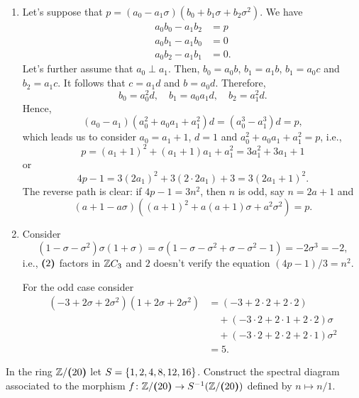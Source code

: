 \begin{solution}
\begin{enumerate}[\rm a)]
        \item Let's suppose that $p=(a_0-a_1\sigma)(b_0+b_1\sigma+b_2\sigma^2)$. We have
        \begin{align*}
            a_0b_0 - a_1b_2 &= p\\
            a_0b_1 - a_1b_0 &= 0\\
            a_0b_2 - a_1b_1 &= 0.
        \end{align*}
        Let's further assume that $a_0\perp a_1$. Then, $b_0=a_0b$, $b_1=a_1b$, $b_1=a_0c$ and $b_2=a_1c$. It follows that $c=a_1d$ and $b=a_0d$. Therefore,
        $$
            b_0=a_0^2d,\quad b_1=a_0a_1d,\quad b_2=a_1^2d.
        $$
        Hence,
        $$
            (a_0-a_1)(a_0^2+a_0a_1+a_1^2)d = (a_0^3-a_1^3)d = p,
        $$
        which leads us to consider $a_0=a_1+1$, $d=1$ and $a_0^2+a_0a_1+a_1^2=p$, i.e.,
        $$
            p = (a_1+1)^2+(a_1+1)a_1 + a_1^2 = 3a_1^2+3a_1+1
        $$
        or
        $$
            4p - 1 = 3(2a_1)^2 + 3(2\cdot 2a_1) + 3
                = 3 (2a_1+1)^2.
        $$
        The reverse path is clear: if $4p-1=3n^2$, then $n$ is odd, say $n=2a+1$ and
        $$
            (a+1-a\sigma)((a+1)^2+a(a+1)\sigma+a^2\sigma^2)=p.
        $$

        \item Consider
        $$
            (1-\sigma-\sigma^2)\sigma(1 + \sigma)
                = \sigma(1-\sigma-\sigma^2+\sigma-\sigma^2-1)=-2\sigma^3=-2,
        $$
        i.e., $\textrm{\boldmath$($}2\textrm{\boldmath$)$}$ factors in $\mathbb{Z} C_3$ and $2$ doesn't verify the equation $(4p-1)/3=n^2.$

        For the odd case consider
        \begin{align*}
            (-3 + 2\sigma + 2\sigma^2)(1 + 2\sigma + 2\sigma^2)
                &= (-3+2\cdot2+2\cdot2)\\
                &\quad+ (-3\cdot2+2\cdot1+2\cdot2)\sigma\\
                &\quad+ (-3\cdot2+2\cdot2+2\cdot1)\sigma^2\\
                &= 5.
        \end{align*}
    \end{enumerate}
\end{solution}

\begin{exr}
    In the ring $\mathbb{Z}/\textrm{\boldmath$($}20\textrm{\boldmath$)$}$ let\/ $S= \{1,2,4,8,12,16\}$. Construct the spectral diagram associated to the morphism\/ $f\colon\mathbb{Z}/\textrm{\boldmath$($}20\textrm{\boldmath$)$}\to S^{-1}(\mathbb{Z}/\textrm{\boldmath$($}20\textrm{\boldmath$)$})$ defined by\/ $n\mapsto n/1$.
\end{exr}

